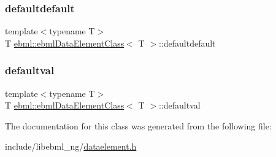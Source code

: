\subsubsection{\texorpdfstring{defaultdefault}{defaultdefault}}
{\footnotesize\ttfamily template$<$typename T$>$ \\
T \mbox{\hyperlink{classebml_1_1ebmlDataElementClass}{ebml\+::ebml\+Data\+Element\+Class}}$<$ T $>$\+::defaultdefault\hspace{0.3cm}{\ttfamily [static]}}

\mbox{\label{classebml_1_1ebmlDataElementClass_a5ad1fcb2708f62d3d80eab6d9ad112be}} 
\subsubsection{\texorpdfstring{defaultval}{defaultval}}
{\footnotesize\ttfamily template$<$typename T$>$ \\
T \mbox{\hyperlink{classebml_1_1ebmlDataElementClass}{ebml\+::ebml\+Data\+Element\+Class}}$<$ T $>$\+::defaultval}



The documentation for this class was generated from the following file\+:\begin{DoxyCompactItemize}
\item 
include/libebml\+\_\+ng/\mbox{\hyperlink{dataelement_8h}{dataelement.\+h}}\end{DoxyCompactItemize}
